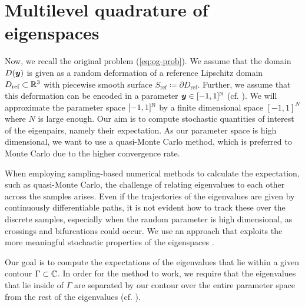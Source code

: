 \chapter{Multilevel quadrature of eigenspaces}\label{chapter:multilevel-quadrature}

Now, we recall the original problem (\ref{eq:og-prob}).
We assume that the domain $D({\boldsymbol y})$ is given as a random deformation of a reference Lipschitz domain $D_{\text{ref}}\subset \mathbb{R}^3$ with piecewise smooth surface $S_{\text{ref}} \coloneq \partial D_{\text{ref}}$.
Further, we assume that this deformation can be encoded in a parameter ${\boldsymbol y} \in [-1,1]^{\mathbb{N}}$ (cf. \cite{DOLZ2022114242}).
We will approximate the parameter space $[-1,1]^{\mathbb{N}}$ by a finite dimensional space $[-1,1]^N$ where $N$ is large enough.
Our aim is to compute stochastic quantities of interest of the eigenpairs, namely their expectation.
As our parameter space is high dimensional, we want to use a quasi-Monte Carlo method, which is preferred to Monte Carlo due to the higher convergence rate.

When employing sampling-based numerical methods to calculate the expectation, such as quasi-Monte Carlo, the challenge of relating eigenvalues to each other across the samples arises.
Even if the trajectories of the eigenvalues are given by continuously differentiable paths, it is not evident how to track these over the discrete samples, especially when the random parameter is high dimensional, as crossings and bifurcations could occur.
We use an approach that exploits the more meaningful stochastic properties of the eigenspaces \cite{Doelz_Ebert_2024}.

Our goal is to compute the expectations of the eigenvalues that lie within a given contour $\Gamma \subset \mathbb{C}$.
In order for the method to work, we require that the eigenvalues that lie inside of $\Gamma$ are separated by our contour over the entire parameter space from the rest of the eigenvalues (cf. \cite{kato_perturbation,grubivsic2023stochastic}).

%

